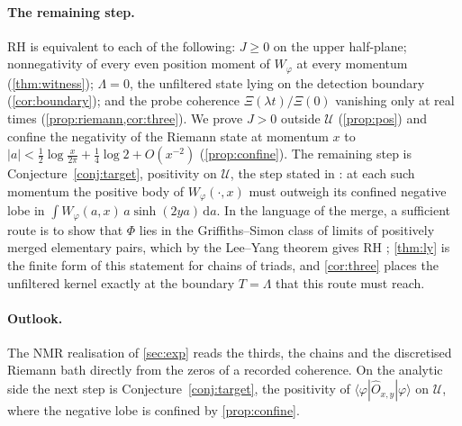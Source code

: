 \documentclass[11pt]{article}
\theoremstyle{definition}\newtheorem{definition}[theorem]{Definition}
\theoremstyle{remark}\newtheorem{remark}[theorem]{Remark}
\newcommand{\dd}{\,\mathrm d}\newcommand{\e}{\mathrm e}
\begin{document}
\paragraph{The remaining step.} RH is equivalent to each of the following: $J\ge0$ on the upper half-plane; nonnegativity of every even position moment of $W_\varphi$ at every momentum (\cref{thm:witness}); $\Lambda=0$, the unfiltered state lying on the detection boundary (\cref{cor:boundary}); and the probe coherence $\Xi(\lambda t)/\Xi(0)$ vanishing only at real times (\cref{prop:riemann,cor:three}). We prove $J>0$ outside $\mathcal U$ (\cref{prop:pos}) and confine the negativity of the Riemann state at momentum $x$ to $|a|<\frac12\log\frac x{2\pi}+\frac14\log2+O(x^{-2})$ (\cref{prop:confine}). The remaining step is Conjecture~\ref{conj:target}, positivity on $\mathcal U$, the step stated in \cite{SMath}: at each such momentum the positive body of $W_\varphi(\cdot,x)$ must outweigh its confined negative lobe in $\int W_\varphi(a,x)\,a\sinh(2ya)\dd a$. In the language of the merge, a sufficient route is to show that $\Phi$ lies in the Griffiths--Simon class of limits of positively merged elementary pairs, which by the Lee--Yang theorem gives RH \cite{SMath}; \cref{thm:ly} is the finite form of this statement for chains of triads, and \cref{cor:three} places the unfiltered kernel exactly at the boundary $T=\Lambda$ that this route must reach.

\paragraph{Outlook.} The NMR realisation of \cref{sec:exp} reads the thirds, the chains and the discretised Riemann bath directly from the zeros of a recorded coherence. On the analytic side the next step is Conjecture~\ref{conj:target}, the positivity of $\langle\varphi|\hat O_{x,y}|\varphi\rangle$ on $\mathcal U$, where the negative lobe is confined by \cref{prop:confine}.
\end{document}
